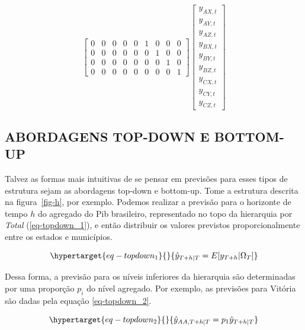 \documentclass[
  12pt,
  letterpaper,
  DIV=11,
  numbers=noendperiod]{scrartcl}
\begin{document}
\[\begin{bmatrix}
    0 & 0 & 0 & 0 & 0 & 1 & 0 & 0 & 0 \\
    0 & 0 & 0 & 0 & 0 & 0 & 1 & 0 & 0 \\
    0 & 0 & 0 & 0 & 0 & 0 & 0 & 1 & 0 \\
    0 & 0 & 0 & 0 & 0 & 0 & 0 & 0 & 1
\end{bmatrix}
\begin{bmatrix}
    y_{AX, t} \\
    y_{AY, t} \\
    y_{AZ, t} \\
    y_{BX, t} \\
    y_{BY, t} \\
    y_{BZ, t} \\
    y_{CX, t} \\
    y_{CY, t} \\
    y_{CZ, t}
\end{bmatrix}
\]

\hypertarget{abordagens-top-down-e-bottom-up}{%
\subsection*{ABORDAGENS TOP-DOWN E
BOTTOM-UP}\label{abordagens-top-down-e-bottom-up}}

Talvez as formas mais intuitivas de se pensar em previsões para esses
tipos de estrutura sejam as abordagens top-down e bottom-up. Tome a
estrutura descrita na figura~\ref{fig-h}, por exemplo. Podemos realizar
a previsão para o horizonte de tempo \(h\) do agregado do Pib
brasileiro, representado no topo da hierarquia por \emph{Total}
(\ref{eq-topdown_1}), e então distribuir os valores previstos
proporcionalmente entre os estados e municípios.

\begin{equation}\protect\hypertarget{eq-topdown_1}{}{
\hat{y}_{T+h | T} = E[y_{T+h} | \Omega_T]
}\label{eq-topdown_1}\end{equation}

Dessa forma, a previsão para os níveis inferiores da hierarquia são
determinadas por uma proporção \(p_i\) do nível agregado. Por exemplo,
as previsões para Vitória são dadas pela equação \ref{eq-topdown_2}.

\begin{equation}\protect\hypertarget{eq-topdown_2}{}{
\hat{y}_{AA, T+h | T} = p_{1}\hat{y}_{T+h | T}
}\label{eq-topdown_2}\end{equation}
\end{document}
